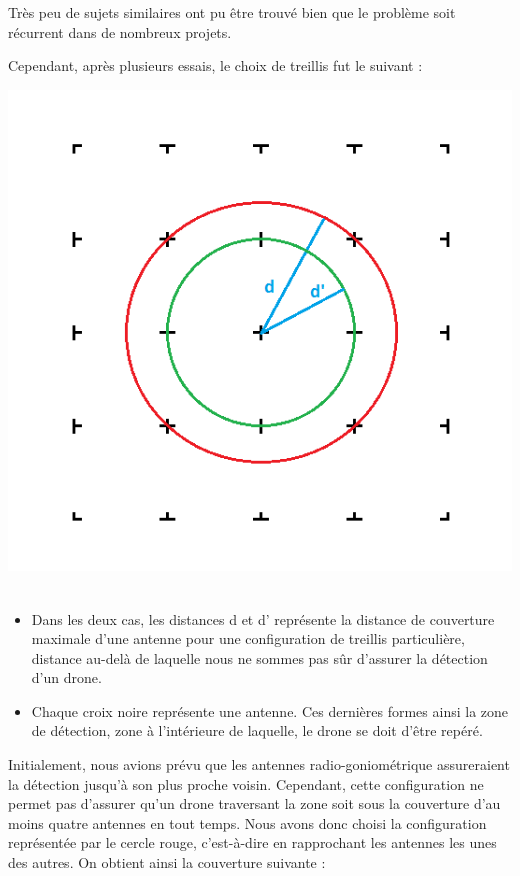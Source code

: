 Très peu de sujets similaires ont pu être trouvé bien que le problème soit récurrent dans de
nombreux projets.

Cependant, après plusieurs essais, le choix de treillis fut le suivant :

\begin{minipage}{0.45\linewidth}

  \centering
  \includegraphics[width=\textwidth]{treillis_explication}
  ~\\
\end{minipage}
\begin{minipage}{0.45\linewidth}
  \begin{itemize}
  \item Dans les deux cas, les distances d et d’ représente la distance de couverture maximale d’une antenne pour une configuration de treillis particulière, distance au-delà de laquelle nous ne sommes pas sûr d’assurer la détection d’un drone.
  \item Chaque croix noire représente une antenne. Ces dernières formes ainsi la zone de détection, zone à l’intérieure de laquelle, le drone se doit d’être repéré.
  \end{itemize}
\end{minipage}


Initialement, nous avions prévu que les antennes radio-goniométrique assureraient la détection
jusqu’à son plus proche voisin. Cependant, cette configuration ne permet pas d’assurer qu’un drone
traversant la zone soit sous la couverture d’au moins quatre antennes en tout temps. Nous avons
donc choisi la configuration représentée par le cercle rouge, c’est-à-dire en rapprochant les antennes
les unes des autres. On obtient ainsi la couverture suivante :
~\\

